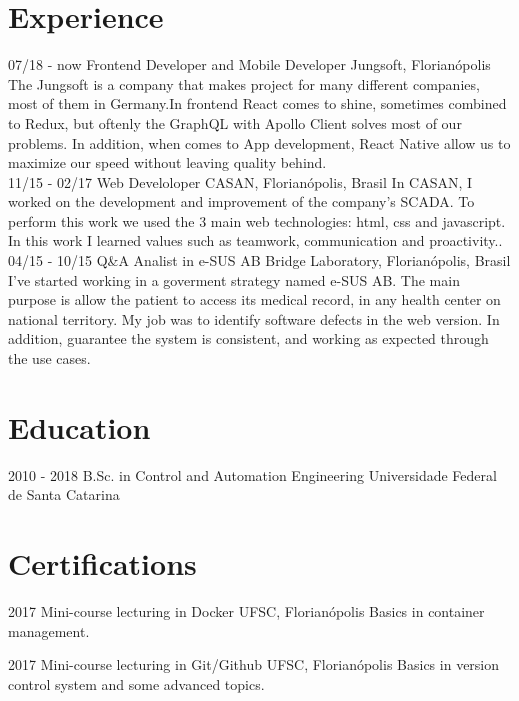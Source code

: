 \documentclass{friggeri-cv}
\begin{document}
\section{Experience}
\begin{entrylist}
  \entry
    {07/18 - now}
    {Frontend Developer and Mobile Developer}
    {Jungsoft, Florianópolis}
    {The Jungsoft is a company that makes project for many different companies, most of them in Germany.In frontend React comes to shine, sometimes combined to Redux, but oftenly the GraphQL with Apollo Client solves most of our problems. In addition, when comes to App development, React Native allow us to maximize our speed without leaving quality behind.\\}
  \entry
    {11/15 - 02/17}
    {Web Develoloper}
    {CASAN, Florianópolis, Brasil}
    {In CASAN, I worked on the development and improvement of the company's SCADA. To perform this work we used the 3 main web technologies: html, css and javascript. In this work I learned values ​​such as teamwork, communication and proactivity.. \\}
  \entry
    {04/15 - 10/15}
    {Q\&A Analist in e-SUS AB}
    {Bridge Laboratory, Florianópolis, Brasil}
    {I've started working in a goverment strategy named e-SUS AB. The main purpose is allow the patient to access its medical record, in any health center on national territory. My job was to identify software defects in the web version. In addition, guarantee the system is consistent, and working as expected through the use cases.}
\end{entrylist}

\section{Education}
\begin{entrylist}
  \entry
    {2010 - 2018}
    {B.Sc. in Control and Automation Engineering}
    {Universidade Federal de Santa Catarina}
\end{entrylist}

\section{Certifications}
\begin{entrylist}
  \entry
    {2017}
    {Mini-course lecturing in Docker}
    {UFSC, Florianópolis}
    {Basics in container management.}
\end{entrylist}
\begin{entrylist}
  \entry
    {2017}
    {Mini-course lecturing in Git/Github}
    {UFSC, Florianópolis}
    {Basics in version control system and some advanced topics.}
\end{entrylist}
\end{document}
